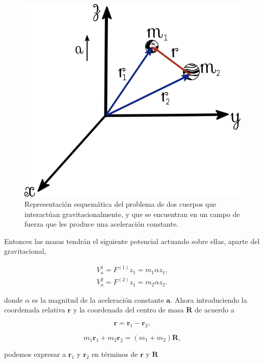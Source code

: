\documentclass[a4paper,10pt]{article}
\numberwithin{equation}{section}
\begin{document}
\begin{figure}[H]
 \center
 \includegraphics[scale=0.45]{problema1fig2}
 \caption{Representación esquemática del problema de dos cuerpos que interactúan 
 gravitacionalmente, y que se encuentran en un campo de fuerza que les produce una 
 aceleración constante.}
 \label{fig:problema1fig1}
\end{figure}

Entonces las masas tendrán el siguiente potencial actuando sobre ellas, aparte 
del gravitacional,

\begin{align}
 V_{a}^{1} = F^{(1)} z_1 = m_1 \alpha z_1, \\
 V_{a}^{2} = F^{(2)} z_1 = m_2 \alpha z_2.
\end{align}

donde $\alpha$ es la magnitud de la aceleración constante $\mathbf{a}$. Ahora introduciendo 
la coordenada relativa $\mathbf{r}$ y la coordenada del centro de masa $\mathbf{R}$ de 
acuerdo a 

\begin{equation}
 \mathbf{r} = \mathbf{r}_1 - \mathbf{r}_2,
\end{equation}

\begin{equation}
 m_1\mathbf{r}_1 + m_2\mathbf{r}_2 = (m_1 + m_2)\mathbf{R},
\end{equation}

podemos expresar a $\mathbf{r}_1$ y $\mathbf{r}_2$ en términos de $\mathbf{r}$ y $\mathbf{R}$
\end{document}
